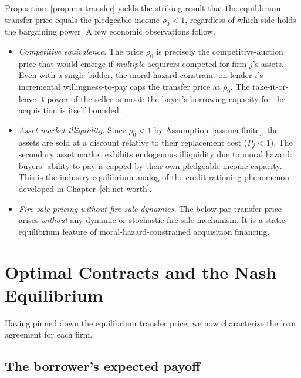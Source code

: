 \documentclass[11pt,a4paper,oneside]{book}
\theoremstyle{plain}
\theoremstyle{definition}
\theoremstyle{remark}
\numberwithin{equation}{chapter}
\begin{document}
Proposition~\ref{prop:ma-transfer} yields the striking result that the equilibrium transfer price equals the pledgeable income $\rho_0 < 1$, regardless of which side holds the bargaining power.
A few economic observations follow.

\begin{itemize}
  \item \emph{Competitive equivalence.} The price $\rho_0$ is precisely the competitive-auction price that would emerge if \emph{multiple} acquirers competed for firm $j$'s assets.
  Even with a single bidder, the moral-hazard constraint on lender $i$'s incremental willingness-to-pay caps the transfer price at $\rho_0$.
  The take-it-or-leave-it power of the seller is moot: the buyer's borrowing capacity for the acquisition is itself bounded.
  \item \emph{Asset-market illiquidity.} Since $\rho_0 < 1$ by Assumption~\ref{ass:ma-finite}, the assets are sold at a discount relative to their replacement cost ($P_j < 1$).
  The secondary asset market exhibits endogenous illiquidity due to moral hazard: buyers' ability to pay is capped by their own pledgeable-income capacity.
  This is the industry-equilibrium analog of the credit-rationing phenomenon developed in Chapter~\ref{ch:net-worth}.
  \item \emph{Fire-sale pricing without fire-sale dynamics.} The below-par transfer price arises \emph{without} any dynamic or stochastic fire-sale mechanism.
  It is a static equilibrium feature of moral-hazard-constrained acquisition financing.
\end{itemize}

\section{Optimal Contracts and the Nash Equilibrium}
\label{sec:ma-equilibrium}

Having pinned down the equilibrium transfer price, we now characterize the loan agreement for each firm.

\subsection{The borrower's expected payoff}
\end{document}
